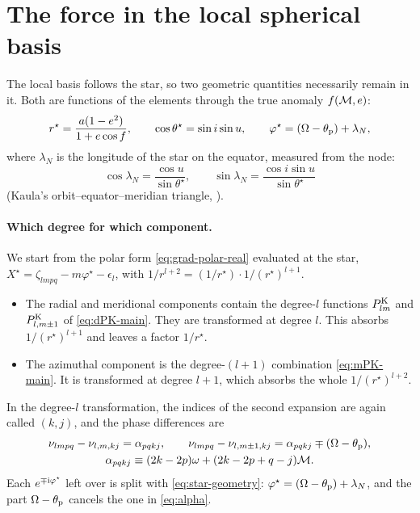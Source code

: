 \section{The force in the local spherical basis}
The local basis follows the star, so two geometric quantities necessarily remain in it. Both are functions of the elements through the true anomaly $f(\mathcal{M},e)$:
\begin{equation}
  r^\star=\frac{a(1-e^2)}{1+e\cos f},\qquad \cos\theta^\star=\sin i\sin u,\qquad \varphi^\star=(\Omega-\theta_{\mathrm p})+\lambda_N, \label{eq:star-geometry}
\end{equation}
where $\lambda_N$ is the longitude of the star on the equator, measured from the node:
\[
  \cos\lambda_N=\frac{\cos u}{\sin\theta^\star},\qquad \sin\lambda_N=\frac{\cos i\sin u}{\sin\theta^\star}
\]
(Kaula's orbit--equator--meridian triangle, \citealt[Fig.~4]{Kaula2000}).

\paragraph{Which degree for which component.} We start from the polar form \eqref{eq:grad-polar-real} evaluated at the star, $X^\star=\zeta_{lmpq}-m\varphi^\star-\epsilon_l$, with $1/r^{l+2}=(1/r^\star)\cdot1/(r^\star)^{l+1}$.
\begin{itemize}
  \item The radial and meridional components contain the degree-$l$ functions $P^{\mathrm K}_{lm}$ and $P^{\mathrm K}_{l,m\pm1}$ of \eqref{eq:dPK-main}. They are transformed at degree $l$. This absorbs $1/(r^\star)^{l+1}$ and leaves a factor $1/r^\star$.
  \item The azimuthal component is the degree-$(l+1)$ combination \eqref{eq:mPK-main}. It is transformed at degree $l+1$, which absorbs the whole $1/(r^\star)^{l+2}$.
\end{itemize}
In the degree-$l$ transformation, the indices of the second expansion are again called $(k,j)$, and the phase differences are
\begin{equation}
  \begin{gathered}
  \nu_{lmpq}-\nu_{l,m,kj}=\alpha_{pqkj},\qquad \nu_{lmpq}-\nu_{l,m\pm1,kj}=\alpha_{pqkj}\mp(\Omega-\theta_{\mathrm p}),\\
  \alpha_{pqkj}\equiv(2k-2p)\omega+(2k-2p+q-j)\mathcal{M}.
  \end{gathered} \label{eq:alpha}
\end{equation}
Each $e^{\mp\mathrm{i}\varphi^\star}$ left over is split with \eqref{eq:star-geometry}: $\varphi^\star=(\Omega-\theta_{\mathrm p})+\lambda_N$, and the part $\Omega-\theta_{\mathrm p}$ cancels the one in \eqref{eq:alpha}.

